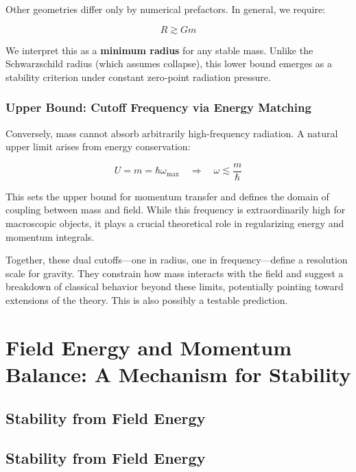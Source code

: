 \documentclass {article}
\begin{document}
Other geometries differ only by numerical prefactors. In general, we require:

\begin{equation}
R \gtrsim G m
\end{equation}

We interpret this as a \textbf{minimum radius} for any stable mass. Unlike the Schwarzschild radius (which assumes collapse), this lower bound emerges as a stability criterion under constant zero-point radiation pressure.

\subsubsection*{Upper Bound: Cutoff Frequency via Energy Matching}

Conversely, mass cannot absorb arbitrarily high-frequency radiation. A natural upper limit arises from energy conservation:


\begin{equation}
U = m = \hbar \omega_{\text{max}} \quad \Rightarrow \quad \omega \lesssim \frac{m}{\hbar}
\end{equation}


This sets the upper bound for momentum transfer and defines the domain of coupling between mass and field. While this frequency is extraordinarily high for macroscopic objects, it plays a crucial theoretical role in regularizing energy and momentum integrals. 

\vspace{0.5em}
Together, these dual cutoffs—one in radius, one in frequency—define a resolution scale for gravity. They constrain how mass interacts with the field and suggest a breakdown of classical behavior beyond these limits, potentially pointing toward extensions of the theory. This is also possibly a testable prediction.




\section{Field Energy and Momentum Balance: A Mechanism for Stability}

\subsection{Stability from Field Energy}

\subsection{Stability from Field Energy}
\end{document}
